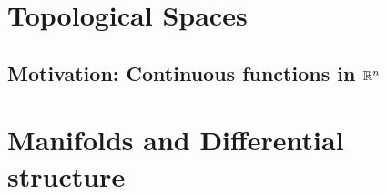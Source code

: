 \documentclass[11pt]{article}
\begin{document}
\setcounter{tocdepth}{3}
\tableofcontents 




\newpage
\section{Topological Spaces}







\subsection{Motivation: Continuous functions in $\mathbb{R}^n$}


\newpage
\section{Manifolds and Differential structure}



\end{document}
